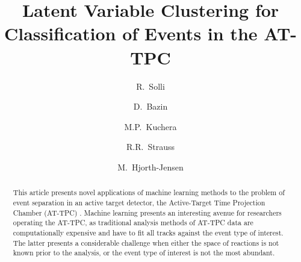 \documentclass[review,number,sort&compress]{elsarticle}
\begin{document}
\begin{frontmatter}


\title{Latent Variable Clustering for Classification of Events in the AT-TPC}


\author{R.~Solli}
\address{Expert Analytics AS, Tordenskiolds gate 6, 0160, Oslo, Norway}
\address{Department of Physics, University of Oslo, POB 1048 Oslo, N-0316 Oslo, Norway}

\author{D.~Bazin}
\address{Department of Physics and Astronomy and Facility for Rare Ion Beams and National Superconducting Cyclotron Facility, Michigan State University, East Lansing, MI 48824, USA}
\author{M.P.~Kuchera}
\address{Department of Physics, Davidson College, Davidson, North Carolina, USA}
\author{R.R.~Strauss}
\address{Department of Mathematics and Computer Science, Davidson College, Davidson, North Carolina, USA}

\author{M.~Hjorth-Jensen}
\address{Department of Physics and Astronomy and Facility for Rare Ion Beams and National Superconducting Cyclotron Facility, Michigan State University, East Lansing, MI 48824, USA}
\address{Department of Physics and Center for Computing in Science Education, University of Oslo, POB 1048 Oslo, N-0316 Oslo, Norway}


\begin{abstract}
This article presents novel applications of machine learning methods to the problem of event separation in an active target detector, the Active-Target Time Projection Chamber (AT-TPC) \cite{Bradt2017}. Machine learning presents an interesting avenue for researchers operating the AT-TPC, as traditional analysis methods of AT-TPC data are computationally expensive and have to fit all tracks against the event type of interest. The latter presents a considerable challenge when either the space of reactions is not known prior to the analysis, or the event type of interest is not the most abundant. 


\end{abstract}
\end{frontmatter}
\end{document}
